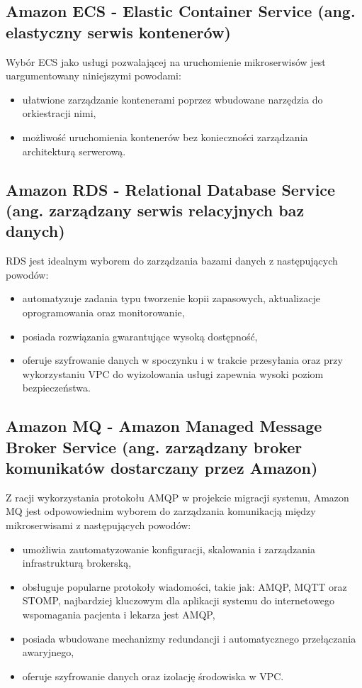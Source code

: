 \documentclass[12pt,twoside]{book}
\begin{document}
    \subsection{Amazon ECS - Elastic Container Service (ang. elastyczny serwis kontenerów)}
    Wybór ECS jako usługi pozwalającej na uruchomienie mikroserwisów jest uargumentowany niniejszymi powodami:

    \begin{itemize}
        \item ułatwione zarządzanie kontenerami poprzez wbudowane narzędzia do orkiestracji nimi,
        \item możliwość uruchomienia kontenerów bez konieczności zarządzania architekturą serwerową. \cite{aws.ecs}
    \end{itemize}

    \subsection{Amazon RDS - Relational Database Service (ang. zarządzany serwis relacyjnych baz danych)}
    RDS jest idealnym wyborem do zarządzania bazami danych z następujących powodów:

    \begin{itemize}
        \item automatyzuje zadania typu tworzenie kopii zapasowych, aktualizacje oprogramowania oraz monitorowanie,
        \item posiada rozwiązania gwarantujące wysoką dostępność,
        \item oferuje szyfrowanie danych w spoczynku i w trakcie przesyłania oraz przy wykorzystaniu VPC do wyizolowania usługi zapewnia wysoki poziom bezpieczeństwa. \cite{aws.rds}
    \end{itemize}

    \subsection{Amazon MQ - Amazon Managed Message Broker Service  (ang. zarządzany broker komunikatów dostarczany przez Amazon)}
    Z racji wykorzystania protokołu AMQP w projekcie migracji systemu, Amazon MQ jest odpowowiednim wyborem do zarządzania komunikacją między mikroserwisami z następujących powodów:

    \begin{itemize}
        \item umożliwia zautomatyzowanie konfiguracji, skalowania i zarządzania infrastrukturą brokerską,
        \item obsługuje popularne protokoły wiadomości, takie jak: AMQP, MQTT oraz STOMP, najbardziej kluczowym dla aplikacji systemu do internetowego wspomagania pacjenta i lekarza jest AMQP,
        \item posiada wbudowane mechanizmy redundancji i automatycznego przełączania awaryjnego,
        \item oferuje szyfrowanie danych oraz izolację środowiska w VPC. \cite{aws.mq}
    \end{itemize}
\end{document}
